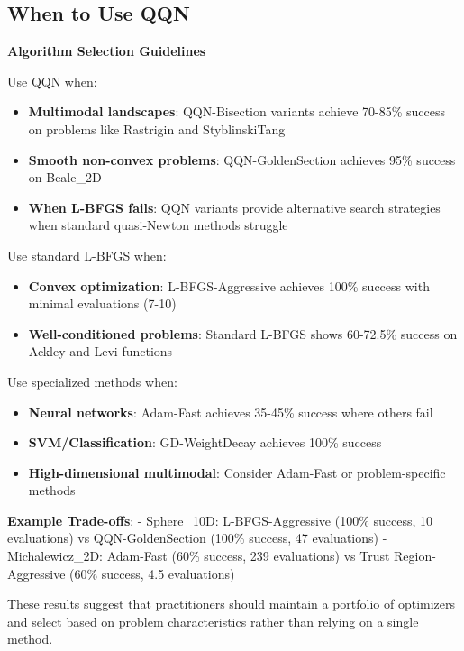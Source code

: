 \hypertarget{when-to-use-qqn}{%
\subsection{When to Use QQN}\label{when-to-use-qqn}}

\textbf{Algorithm Selection Guidelines}

Use QQN when:

\begin{itemize}
\tightlist
\item
  \textbf{Multimodal landscapes}: QQN-Bisection variants achieve 70-85\% success on problems like Rastrigin and StyblinskiTang
\item
  \textbf{Smooth non-convex problems}: QQN-GoldenSection achieves 95\% success on Beale\_2D
\item
  \textbf{When L-BFGS fails}: QQN variants provide alternative search strategies when standard quasi-Newton methods struggle
\end{itemize}

Use standard L-BFGS when:

\begin{itemize}
\tightlist
\item
  \textbf{Convex optimization}: L-BFGS-Aggressive achieves 100\% success with minimal evaluations (7-10)
\item
  \textbf{Well-conditioned problems}: Standard L-BFGS shows 60-72.5\% success on Ackley and Levi functions
\end{itemize}

Use specialized methods when:

\begin{itemize}
\tightlist
\item
  \textbf{Neural networks}: Adam-Fast achieves 35-45\% success where others fail
\item
  \textbf{SVM/Classification}: GD-WeightDecay achieves 100\% success
\item
  \textbf{High-dimensional multimodal}: Consider Adam-Fast or problem-specific methods
\end{itemize}

\textbf{Example Trade-offs}:
- Sphere\_10D: L-BFGS-Aggressive (100\% success, 10 evaluations) vs QQN-GoldenSection (100\% success, 47 evaluations)
- Michalewicz\_2D: Adam-Fast (60\% success, 239 evaluations) vs Trust Region-Aggressive (60\% success, 4.5 evaluations)

These results suggest that practitioners should maintain a portfolio of optimizers and select based on problem characteristics rather than relying on a single method.

